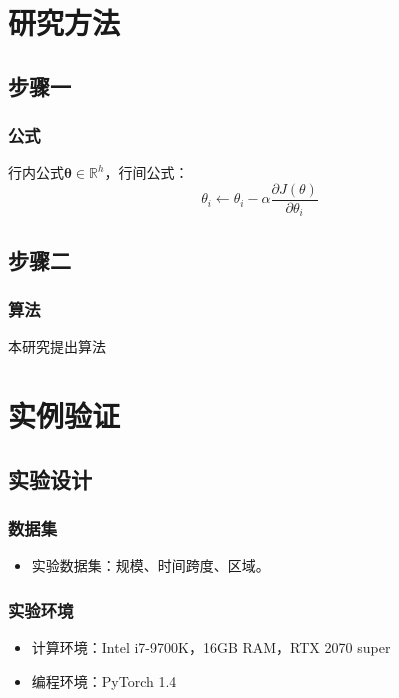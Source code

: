 \documentclass[AutoFakeBold,AutoFakeSlant]{beamer}
\begin{document}
\section{研究方法}

\subsection{步骤一}

\begin{frame}
  \frametitle{公式}
  行内公式$\boldsymbol{\theta}\in\mathbb{R}^{h}$，行间公式：
  \begin{equation}
    \theta_{i}\leftarrow\theta_{i}-\alpha\frac{\partial J(\theta)}{\partial\theta_{i}}
  \label{equ}
  \end{equation}
\end{frame}

\subsection{步骤二}

\begin{frame}
  \frametitle{算法}

  \begin{algorithm}[H]
  \footnotesize
  \caption{本研究提出算法}
  \label{algo}
  \end{algorithm}
\end{frame}

\section{实例验证}

\subsection{实验设计}
\begin{frame}
  \frametitle{数据集}

  \begin{itemize}
    \item 实验数据集：规模、时间跨度、区域。
  \end{itemize}
\end{frame}

\begin{frame}
  \frametitle{实验环境}

  \begin{itemize}
    \item 计算环境：Intel i7-9700K，16GB RAM，RTX 2070 super
    \item 编程环境：PyTorch 1.4
  \end{itemize}
\end{frame}
\end{document}

